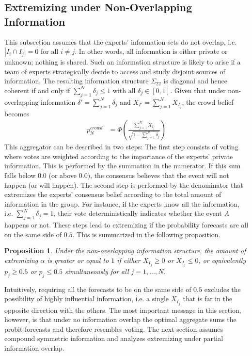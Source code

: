 \documentclass[11pt]{article}
\newtheorem{proposition}[theorem]{Proposition}
\theoremstyle{definition}
\theoremstyle{definition}
\begin{document}
\subsection{Extremizing under Non-Overlapping Information}
\label{disjoint}
This subsection assumes that the experts' information sets do not overlap, i.e.   $|I_{i} \cap I_{j}| = 0$ for all $i \neq j$. In other words, all information is either private or unknown; nothing is shared. Such an information structure is likely to arise if a team of experts strategically decide to access and study disjoint sources of information. The resulting information structure $\Sigma_{22}$ is diagonal and hence coherent if and only if $\sum_{j=1}^N \delta_j \leq 1$ with all $\delta_j \in [0,1]$. Given that under non-overlapping information $\delta' = \sum_{j=1}^N \delta_j$ and $X_{I'} = \sum_{j=1}^N X_{I_j}$, the crowd belief becomes
 \begin{align}
p^{crowd}_N &= \Phi\left( \frac{\sum_{j=1}^N X_{I_j}}{\sqrt{1- \sum_{j=1}^N \delta_j}} \right) \label{vote}
\end{align}
This aggregator can be described in two steps: The first step consists of voting where votes are weighted according to the importance of the experts' private information. This is performed by the summation in the numerator. If this sum falls below $0.0$ (or above $0.0$), the consensus believes that the event will not happen (or will happen). The second step is performed by the denominator that extremizes the experts'  consensus belief according to the total amount of information in the group. For instance, if the experts know all the information, i.e. $\sum_{j=1}^N \delta_j = 1$, their vote deterministically indicates whether the event $A$ happens or not. These steps lead to extremizing if the probability forecasts are all on the same side of $0.5$. This is summarized in the following proposition. 
 \begin{proposition}
\label{positiveThmVote}
Under the non-overlapping information structure, the amount of extremizing $\alpha$ is greater or equal to $1$ if either $X_{I_j} \geq 0$ or  $X_{I_j} \leq 0$, or equivalently $p_j \geq 0.5$ or $p_j \leq 0.5$ simultaneously for all $j = 1, \dots, N$. 
\end{proposition}
Intuitively, requiring all the forecasts to be on the same side of $0.5$ excludes the possibility of highly influential information, i.e. a single $X_{I_j}$ that is far in the opposite direction with the others. The most important message in this section, however, is that under no information overlap the optimal aggregate sums the probit forecasts and therefore resembles voting. The next section assumes compound symmetric information and analyzes extremizing under partial information overlap.
\end{document}
